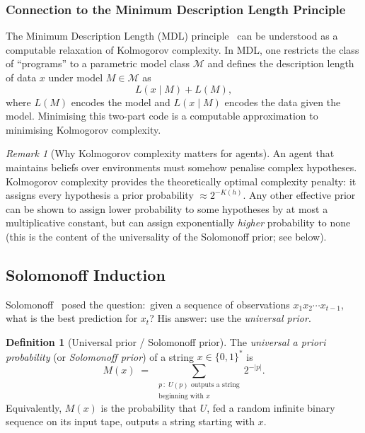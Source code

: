 \documentclass[11pt,a4paper]{article}
\theoremstyle{definition}
\newtheorem{definition}[theorem]{Definition}
\theoremstyle{remark}
\newtheorem{remark}[theorem]{Remark}
\newcommand{\Bstar}{\{0,1\}^*}
\begin{document}
\subsubsection{Connection to the Minimum Description Length Principle}

The Minimum Description Length (MDL) principle~\cite{Rissanen1978,Grunwald2007}
can be understood as a computable relaxation of Kolmogorov complexity.
In MDL, one restricts the class of ``programs'' to a parametric model class
$\mathcal{M}$ and defines the description length of data $x$ under model
$M\in\mathcal{M}$ as
\[
  L(x\mid M) + L(M),
\]
where $L(M)$ encodes the model and $L(x\mid M)$ encodes the data given the
model.  Minimising this two-part code is a computable approximation to
minimising Kolmogorov complexity.

\begin{remark}[Why Kolmogorov complexity matters for agents]
An agent that maintains beliefs over environments must somehow penalise complex
hypotheses.  Kolmogorov complexity provides the theoretically optimal
complexity penalty: it assigns every hypothesis a prior probability
$\approx 2^{-K(h)}$.  Any other effective prior can be shown to
assign lower probability to some hypotheses by at most a multiplicative
constant, but can assign exponentially \emph{higher} probability to none
(this is the content of the universality of the Solomonoff prior; see below).
\end{remark}

\subsection{Solomonoff Induction}\label{sec:solomonoff}

Solomonoff~\cite{Solomonoff1964} posed the question:\ given a sequence of
observations $x_1 x_2\cdots x_{t-1}$, what is the best prediction for $x_t$?
His answer: use the \emph{universal prior}.

\begin{definition}[Universal prior / Solomonoff prior]\label{def:solomonoff}
The \emph{universal a priori probability} (or \emph{Solomonoff prior}) of a
string $x\in\Bstar$ is
\[
  M(x) \;=\; \sum_{\substack{p\,:\; U(p)\text{ outputs a string}\\ \text{beginning with }x}} 2^{-|p|}.
\]
Equivalently, $M(x)$ is the probability that $U$, fed a random infinite
binary sequence on its input tape, outputs a string starting with $x$.
\end{definition}
\end{document}

